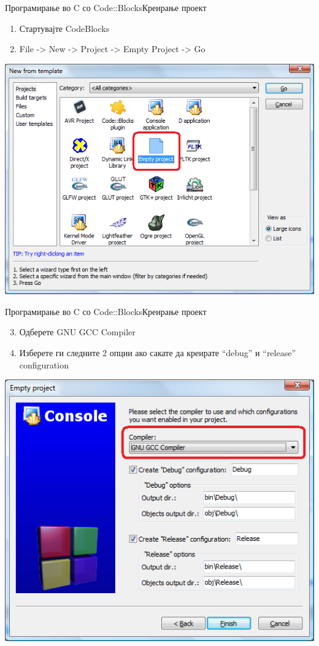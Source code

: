 \begin{frame}{Програмирање во C со Code::Blocks}{Креирање проект}
\begin{enumerate}
  \item Стартувајте CodeBlocks
  \item File -> New -> Project -> Empty Project -> Go 
\end{enumerate}
\begin{center}
\includegraphics[scale=0.3]{images/cb_new}
\end{center}
\end{frame}

\begin{frame}{Програмирање во C со Code::Blocks}{Креирање проект}
\begin{enumerate}
\setcounter{enumi}{2}
  \item Одберете  GNU GCC Compiler
  \item Изберете ги следните 2 опции ако сакате да креирате “debug” и “release”
  configuration
\end{enumerate}
\begin{center}
\includegraphics[scale=0.3]{images/cb_compiler}
\end{center}
\end{frame}

